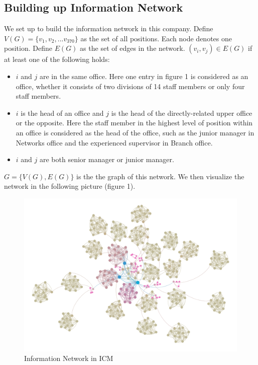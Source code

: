 \documentclass[tcn = 37075, sheet = true, abstract = true]{mcmthesis}
\begin{document}
\subsection{Building up Information Network}

We set up to build the information network in this company. Define $V(G)=\{v_1,v_2,...v_{370}\}$ as the set of all positions. Each node denotes one position. Define $E(G)$ as the set of edges in the network. $(v_i,v_j)\in E(G)$ if at least one of the following holds:


\begin{itemize}
\item $i$ and $j$ are in the same office. Here one entry in figure 1 is considered as an office, whether it consists of two divisions of 14 staff members or only four staff members.
\item $i$ is the head of an office and $j$ is the head of the directly-related upper office or the opposite. Here the staff member in the highest level of position within an office is considered as the head of the office, such as the junior manager in Networks office and the experienced supervisor in Branch office.
\item $i$ and $j$ are both senior manager or junior manager.
\end{itemize}

$G=\{V(G),E(G)\}$ is the the graph of this network. We then visualize the network in the following picture (figure 1).

\begin{figure}[htb!]
\small
\centering
\includegraphics[width=15cm]{figure_2.png}
\caption{Information Network in ICM} \label{fig:Information Network in ICM}
\end{figure}
\end{document}

